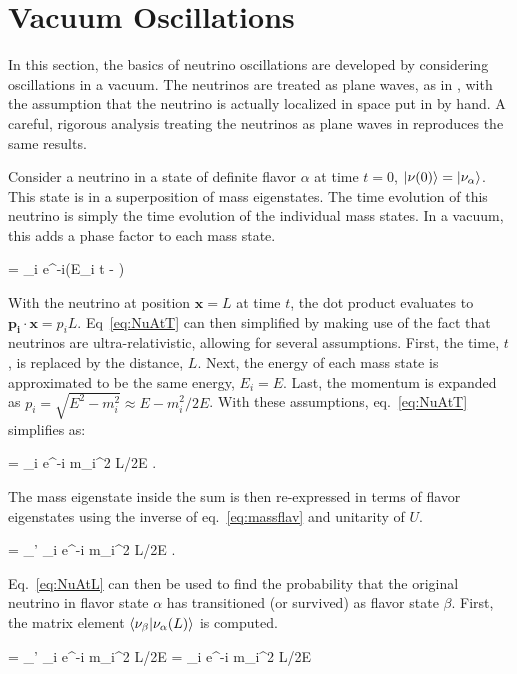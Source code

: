 \section{Vacuum Oscillations}

In this section, the basics of neutrino oscillations are developed by considering oscillations in a vacuum. The neutrinos are treated as plane waves, as in \cite{ref:PlaneWaves}, with the assumption that the neutrino is actually localized in space put in by hand. A careful, rigorous analysis treating the neutrinos as plane waves in \cite{ref:WavePackets} reproduces the same results.

Consider a neutrino in a state of definite flavor $\alpha$ at time $t = 0$, $\ket{\nu(0)} = \ket{\nu_\alpha}$. This state is in a superposition of mass eigenstates. The time evolution of this neutrino is simply the time evolution of the individual mass states. In a vacuum, this adds a phase factor to each mass state.

\beq
{} = \sum_{i}  e^{-i(E_i t - )} 
\label{eq:NuAtT}
\eeq

\n With the neutrino at position $\mathbf{x} = L$ at time $t$, the dot product evaluates to $\mathbf{p_i \cdot x} = p_i L$. Eq~\ref{eq:NuAtT} can then simplified by making use of the fact that neutrinos are ultra-relativistic, allowing for several assumptions. First, the time, $t$, is replaced by the distance, $L$. Next, the energy of each mass state is approximated to be the same energy, $E_i = E$. Last, the momentum is expanded as $p_i = \sqrt{E^2 - m_i^2} \approx E - m_i^2/2E$. With these assumptions, eq.~\ref{eq:NuAtT} simplifies as:

\beq
{} = \sum_{i}  e^{-i m_i^2 L/2E} .
\label{eq:NuAtTRel}
\eeq

\n The mass eigenstate inside the sum is then re-expressed in terms of flavor eigenstates using the inverse of eq.~\ref{eq:massflav} and unitarity of $U$.

\beq
{} = \sum_{\alpha'} \sum_{i}   e^{-i m_i^2 L/2E} .
\label{eq:NuAtL}
\eeq

Eq.~\ref{eq:NuAtL} can then be used to find the probability that the original neutrino in flavor state $\alpha$ has transitioned (or survived) as flavor state $\beta$. First, the matrix element $\braket{\nu_\beta | \nu_\alpha (L)}$ is computed.

\beq
{} = \sum_{\alpha'} \sum_{i}   e^{-i m_i^2 L/2E} 
= \sum_i   e^{-i m_i^2 L/2E}
\label{eq:nuAB}
\eeq

